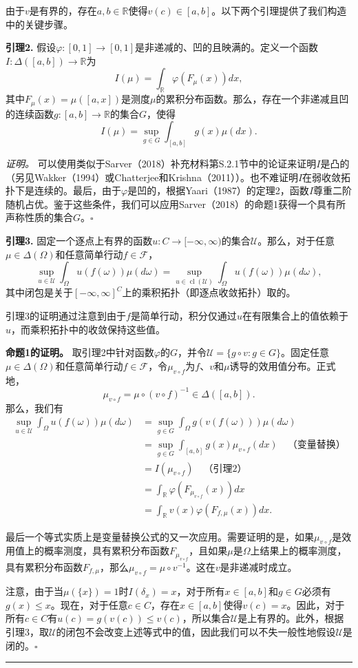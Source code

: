\documentclass[12pt,a4paper]{article}
\newenvironment{translation}
  {\par\noindent\color{blue!70!black}\smallskip}
  {\par\medskip\hrule\medskip}
\begin{document}
\begin{translation}
由于$v$是有界的，存在$a, b \in \mathbb{R}$使得$v(c) \in [a, b]$。以下两个引理提供了我们构造中的关键步骤。

\textbf{引理2.} 假设$\varphi: [0, 1] \to [0, 1]$是非递减的、凹的且映满的。定义一个函数$I: \Delta([a, b]) \to \mathbb{R}$为
\[
I(\mu) = \int_{\mathbb{R}} \varphi(F_\mu(x)) dx,
\]
其中$F_\mu(x) = \mu([a, x])$是测度$\mu$的累积分布函数。那么，存在一个非递减且凹的连续函数$g: [a, b] \to \mathbb{R}$的集合$G$，使得
\[
I(\mu) = \sup_{g \in G} \int_{[a,b]} g(x) \mu(dx).
\]

\textit{证明。} 可以使用类似于Sarver（2018）补充材料第S.2.1节中的论证来证明$I$是凸的（另见Wakker（1994）或Chatterjee和Krishna（2011））。也不难证明$I$在弱收敛拓扑下是连续的。最后，由于$\varphi$是凹的，根据Yaari（1987）的定理2，函数$I$尊重二阶随机占优。鉴于这些条件，我们可以应用Sarver（2018）的命题1获得一个具有所声称性质的集合$G$。$\square$

\textbf{引理3.} 固定一个逐点上有界的函数$u: C \to [-\infty, \infty)$的集合$\mathcal{U}$。那么，对于任意$\mu \in \Delta(\Omega)$和任意简单行动$f \in \mathcal{F}$，
\[
\sup_{u \in \mathcal{U}} \int_\Omega u(f(\omega)) \mu(d\omega) = \sup_{u \in \operatorname{cl}(\mathcal{U})} \int_\Omega u(f(\omega)) \mu(d\omega),
\]
其中闭包是关于$[-\infty, \infty]^C$上的乘积拓扑（即逐点收敛拓扑）取的。

引理3的证明通过注意到由于$f$是简单行动，积分仅通过$u$在有限集合上的值依赖于$u$，而乘积拓扑中的收敛保持这些值。

\textbf{命题1的证明。} 取引理2中针对函数$\varphi$的$G$，并令$\mathcal{U} = \{ g \circ v : g \in G \}$。固定任意$\mu \in \Delta(\Omega)$和任意简单行动$f \in \mathcal{F}$，令$\mu_{v\circ f}$为$f$、$v$和$\mu$诱导的效用值分布。正式地，
\[
\mu_{v\circ f} = \mu \circ (v \circ f)^{-1} \in \Delta([a, b]).
\]
那么，我们有
\begin{align*}
\sup_{u \in \mathcal{U}} \int_\Omega u(f(\omega)) \mu(d\omega) &= \sup_{g \in G} \int_\Omega g(v(f(\omega))) \mu(d\omega) \\
&= \sup_{g \in G} \int_{[a,b]} g(x) \mu_{v\circ f}(dx) \quad \text{（变量替换）} \\
&= I(\mu_{v\circ f}) \quad \text{（引理2）} \\
&= \int_{\mathbb{R}} \varphi(F_{\mu_{v\circ f}}(x)) dx \\
&= \int_{\mathbb{R}} v(x) \varphi(F_{f,\mu}(x)) dx.
\end{align*}

最后一个等式实质上是变量替换公式的又一次应用。需要证明的是，如果$\mu_{v\circ f}$是效用值上的概率测度，具有累积分布函数$F_{\mu_{v\circ f}}$，且如果$\mu$是$\Omega$上结果上的概率测度，具有累积分布函数$F_{f,\mu}$，那么$\mu_{v\circ f} = \mu \circ v^{-1}$。这在$v$是非递减时成立。

注意，由于当$\mu(\{x\}) = 1$时$I(\delta_x) = x$，对于所有$x \in [a, b]$和$g \in G$必须有$g(x) \leq x$。现在，对于任意$c \in C$，存在$x \in [a,b]$使得$v(c) = x$。因此，对于所有$c \in C$有$u(c) = g(v(c)) \leq v(c)$，所以集合$\mathcal{U}$是上有界的。此外，根据引理3，取$\mathcal{U}$的闭包不会改变上述等式中的值，因此我们可以不失一般性地假设$\mathcal{U}$是闭的。$\square$
\end{translation}
\end{document}
